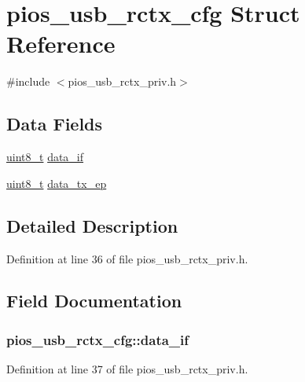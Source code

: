 \hypertarget{structpios__usb__rctx__cfg}{\section{pios\-\_\-usb\-\_\-rctx\-\_\-cfg Struct Reference}
\label{structpios__usb__rctx__cfg}
}


{\ttfamily \#include $<$pios\-\_\-usb\-\_\-rctx\-\_\-priv.\-h$>$}

\subsection*{Data Fields}
\begin{DoxyCompactItemize}
\item 
\hyperlink{stdint_8h_aba7bc1797add20fe3efdf37ced1182c5}{uint8\-\_\-t} \hyperlink{structpios__usb__rctx__cfg_a4b8d76465e724b69a2fdeb4ebf0c9560}{data\-\_\-if}
\item 
\hyperlink{stdint_8h_aba7bc1797add20fe3efdf37ced1182c5}{uint8\-\_\-t} \hyperlink{structpios__usb__rctx__cfg_ae5eb2a2117797f91ee47f0535032cd54}{data\-\_\-tx\-\_\-ep}
\end{DoxyCompactItemize}


\subsection{Detailed Description}


Definition at line 36 of file pios\-\_\-usb\-\_\-rctx\-\_\-priv.\-h.



\subsection{Field Documentation}
\hypertarget{structpios__usb__rctx__cfg_a4b8d76465e724b69a2fdeb4ebf0c9560}{
\subsubsection[{data\-\_\-if}]{ pios\-\_\-usb\-\_\-rctx\-\_\-cfg\-::data\-\_\-if}}\label{structpios__usb__rctx__cfg_a4b8d76465e724b69a2fdeb4ebf0c9560}


Definition at line 37 of file pios\-\_\-usb\-\_\-rctx\-\_\-priv.\-h.

